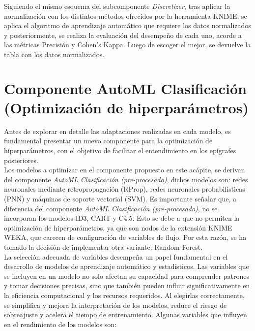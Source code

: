 Siguiendo el mismo esquema del subcomponente \textit{Discretizer}, tras aplicar la normalización con los distintos métodos ofrecidos por la herramienta KNIME, se aplica el algoritmo de aprendizaje automático que requiere los datos normalizados y posteriormente, se realiza la evaluación del desempeño de cada uno, acorde a las métricas Precisión y Cohen's Kappa. Luego de escoger el mejor, se devuelve la tabla con los datos normalizados.


\section{Componente AutoML Clasificación (Optimización de hiperparámetros)}
Antes de explorar en detalle las adaptaciones realizadas en cada modelo, es fundamental presentar un nuevo componente para la optimización de hiperparámetros, con el objetivo de facilitar el entendimiento en los epígrafes posteriores. \\
Los modelos a optimizar en el componente propuesto en este acápite, se derivan del componente \textit{AutoML Clasificación (pre-procesado)}, dichos modelos son: redes neuronales mediante retropropagación (RProp), redes neuronales probabilísticas (PNN) y máquinas de soporte vectorial (SVM). Es importante señalar que, a diferencia del componente \textit{AutoML Clasificación (pre-procesado)}, no se incorporan los modelos ID3, CART y C4.5. Esto se debe a que no permiten la optimización de hiperparámetros, ya que son nodos de la extensión KNIME WEKA, que carecen de configuración de variables de flujo. Por esta razón, se ha tomado la decisión de implementar otra variante: Random Forest. \\
La selección adecuada de variables desempeña un papel fundamental en el desarrollo de modelos de aprendizaje automático y estadísticos. Las variables que se incluyen en un modelo no solo afectan su capacidad para comprender patrones y tomar decisiones precisas, sino que también pueden influir significativamente en la eficiencia computacional y los recursos requeridos. Al elegirlas correctamente, se simplifica y mejora la interpretación de los modelos, reduce el riesgo de sobreajuste y acelera el tiempo de entrenamiento. Algunas variables que influyen en el rendimiento de los modelos son: 
